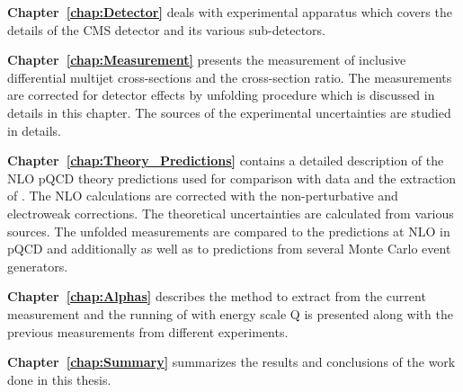 {\bf Chapter~\ref{chap:Detector}} deals with experimental apparatus which covers the details of the CMS detector and its various sub-detectors.

{\bf Chapter~\ref{chap:Measurement}} presents the measurement of inclusive differential multijet cross-sections and the cross-section ratio. The measurements are corrected for detector effects by unfolding procedure which is discussed in details in this chapter. The sources of the experimental uncertainties are studied in details. 

{\bf Chapter~\ref{chap:Theory_Predictions}} contains a detailed description of the NLO pQCD theory predictions used for comparison with data and the extraction of \alps. The NLO calculations are corrected with the non-perturbative and electroweak corrections. The theoretical uncertainties are calculated from various sources. The unfolded measurements are compared to the predictions at NLO in pQCD and additionally as well as to predictions from several Monte Carlo event generators.  

{\bf Chapter~\ref{chap:Alphas}} describes the method to extract \alpsmz from the current measurement and the running of \alps with energy scale Q is presented along with the previous measurements from different experiments.

{\bf Chapter~\ref{chap:Summary}} summarizes the results and conclusions of the work done in this thesis.
